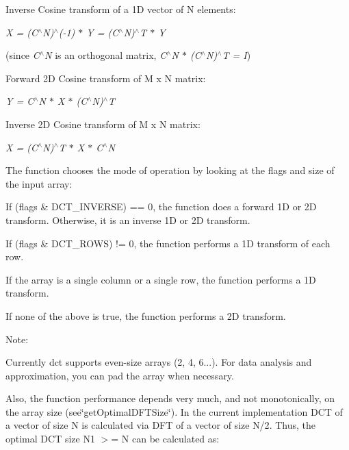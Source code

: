 \begin{DoxyItemize}
\item Inverse Cosine transform of a 1D vector of {\ttfamily N} elements\+: 
\end{DoxyItemize}

{\itshape X = (C$^\wedge$N)$^\wedge$(-\/1) $\ast$ Y = (C$^\wedge$N)$^\wedge$T $\ast$ Y}

(since {\itshape C$^\wedge$N} is an orthogonal matrix, {\itshape C$^\wedge$N $\ast$ (C$^\wedge$N)$^\wedge$T = I})


\begin{DoxyItemize}
\item Forward 2D Cosine transform of {\ttfamily M x N} matrix\+: 
\end{DoxyItemize}

{\itshape Y = C$^\wedge$N $\ast$ X $\ast$ (C$^\wedge$N)$^\wedge$T}


\begin{DoxyItemize}
\item Inverse 2D Cosine transform of {\ttfamily M x N} matrix\+: 
\end{DoxyItemize}

{\itshape X = (C$^\wedge$N)$^\wedge$T $\ast$ X $\ast$ C$^\wedge$N}

The function chooses the mode of operation by looking at the flags and size of the input array\+:


\begin{DoxyItemize}
\item If {\ttfamily (flags \& D\+C\+T\+\_\+\+I\+N\+V\+E\+R\+SE) == 0}, the function does a forward 1D or 2D transform. Otherwise, it is an inverse 1D or 2D transform. 
\item If {\ttfamily (flags \& D\+C\+T\+\_\+\+R\+O\+WS) != 0}, the function performs a 1D transform of each row. 
\item If the array is a single column or a single row, the function performs a 1D transform. 
\item If none of the above is true, the function performs a 2D transform. 
\end{DoxyItemize}

Note\+:

Currently {\ttfamily dct} supports even-\/size arrays (2, 4, 6...). For data analysis and approximation, you can pad the array when necessary.

Also, the function performance depends very much, and not monotonically, on the array size (see\char`\"{}get\+Optimal\+D\+F\+T\+Size\char`\"{}). In the current implementation D\+CT of a vector of size {\ttfamily N} is calculated via D\+FT of a vector of size {\ttfamily N/2}. Thus, the optimal D\+CT size {\ttfamily N1 $>$= N} can be calculated as\+: {\ttfamily }

